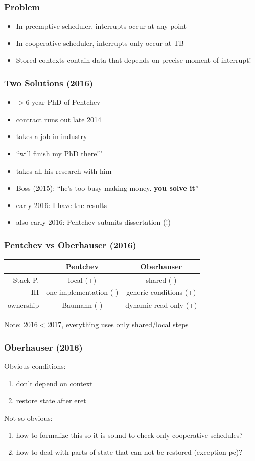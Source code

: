 \documentclass{beamer}
\begin{document}
\begin{frame} 
\frametitle{Problem}
\begin{itemize}
	\item In preemptive scheduler, interrupts occur at any point
	\begin{center} 
	\end{center} 
	\item In cooperative scheduler, interrupts only occur at TB
	\begin{center} 
	\end{center} 
	\item<2-> Stored contexts contain data that depends on precise moment of interrupt!
\end{itemize}
\end{frame}

\begin{frame}
\frametitle{Two Solutions (2016)}
\begin{itemize}
	\item $>$6-year PhD of Pentchev
	\item contract runs out late 2014
	\item takes a job in industry
	\item ``will finish my PhD there!''
	\item<2-> takes all his research with him
	\item<3-> Boss (2015): ``he's too busy making money. \textbf{you solve it}''
	\item<4-> early 2016: I have the results
	\item<5-> also early 2016: Pentchev submits dissertation (!)
\end{itemize}
\end{frame}

\begin{frame}
\frametitle{Pentchev vs Oberhauser (2016)}
\begin{tabular}{r|cc}
	& Pentchev & Oberhauser
	\\
\hline Stack P. & local (+) & shared (-)
	\\
IH & one implementation (-) & generic conditions (+)
	\\
ownership & Baumann (-) & dynamic read-only (+)
\end{tabular}
\vfill 
Note: 2016$<$2017, everything uses only shared/local steps
\end{frame}

\begin{frame}
\frametitle{Oberhauser (2016)}
Obvious conditions:
\begin{enumerate} 
	\item don't depend on context
	\item restore state after eret
\end{enumerate} 
\vfill
Not so obvious:
\begin{enumerate}
	\item how to formalize this so it is sound to check only cooperative schedules?
	\item how to deal with parts of state that can not be restored (exception pc)?
\end{enumerate}
\end{frame}
\end{document}
